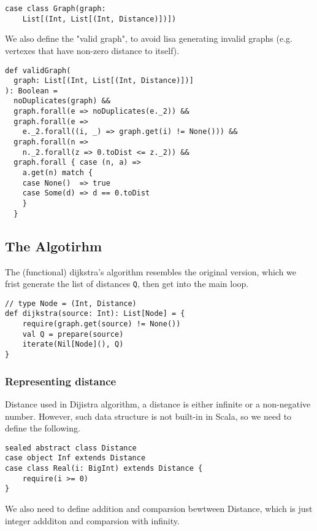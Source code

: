 \documentclass[11pt,a4paper]{article}
\begin{document}
\begin{lstlisting}
case class Graph(graph: 
    List[(Int, List[(Int, Distance)])])
\end{lstlisting}

We also define the "valid graph", to avoid lisa generating invalid
graphs (e.g. vertexes that have non-zero distance to itself).

\begin{lstlisting}
def validGraph(
  graph: List[(Int, List[(Int, Distance)])]
): Boolean =
  noDuplicates(graph) &&
  graph.forall(e => noDuplicates(e._2)) &&
  graph.forall(e => 
    e._2.forall((i, _) => graph.get(i) != None())) &&
  graph.forall(n => 
    n._2.forall(z => 0.toDist <= z._2)) &&
  graph.forall { case (n, a) =>
    a.get(n) match {
    case None()  => true
    case Some(d) => d == 0.toDist
    }
  }
\end{lstlisting}


\subsection{The Algotirhm}

The (functional) dijkstra's algorithm resembles the original version,
which we frist generate the list of distances \texttt{Q}, then get into
the main loop.

\begin{lstlisting}
// type Node = (Int, Distance)
def dijkstra(source: Int): List[Node] = {
    require(graph.get(source) != None())
    val Q = prepare(source)
    iterate(Nil[Node](), Q)
}
\end{lstlisting}

\subsubsection{Representing distance}

Distance used in Dijistra algorithm, a distance is either infinite or 
a non-negative number. However, such data structure is not built-in in
Scala, so we need to define the following.


\begin{lstlisting}
sealed abstract class Distance
case object Inf extends Distance
case class Real(i: BigInt) extends Distance { 
    require(i >= 0) 
}
\end{lstlisting}

We also need to define addition and comparsion bewtween Distance, 
which is just integer addditon and comparsion with infinity.
\end{document}
